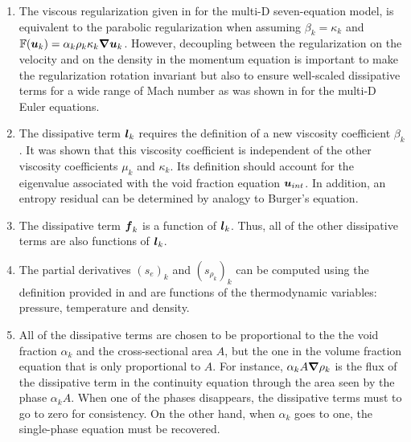 \begin{enumerate}
\item {The viscous regularization given in  for the multi-D seven-equation model, is equivalent to the parabolic regularization \cite{Parabolic} when assuming $\beta_k = \kappa_k$ and $\mathbb{F}(\boldsymbol u_k) = \alpha_k \rho_k \kappa_k \boldsymbol{\nabla} \boldsymbol u_k$. However, decoupling between the regularization on the velocity and on the density in the momentum equation is important to make the regularization rotation invariant but also to ensure well-scaled dissipative terms for a wide range of Mach number as was shown in  for the multi-D Euler equations.}
\item {The dissipative term $\boldsymbol l_k$ requires the definition of a new viscosity
    coefficient $\beta_k$. It was shown that this viscosity coefficient is independent of
    the other viscosity coefficients $\mu_k$ and $\kappa_k$. Its definition should
    account for the eigenvalue associated with the void fraction equation $\boldsymbol u_{int}$.
    In addition, an entropy residual can be determined by analogy to Burger's
    equation. }

\item {The dissipative term $\boldsymbol f_k$ is a function of $\boldsymbol l_k$. Thus, all of the other
    dissipative terms are also functions of $\boldsymbol l_k$.}

\item {The partial derivatives $(s_e)_k$ and $(s_{\rho_k})_k$ can be computed using the
    definition provided in  and are functions of the thermodynamic
    variables: pressure, temperature and density.}

\item {All of the dissipative terms are chosen to be proportional to the the void
    fraction $\alpha_k$ and the cross-sectional area $A$, but the one in the volume fraction equation that is only proportional to $A$. For instance, $\alpha_k A \boldsymbol{\nabla} \rho_k$ is the
    flux of the dissipative term in the continuity equation through the area seen
    by the phase $\alpha_k A$. When one of the phases disappears, the dissipative terms
    must to go to zero for consistency. On the other hand, when $\alpha_k$ goes to one,
    the single-phase equation must be recovered. }
    

\end{enumerate}
